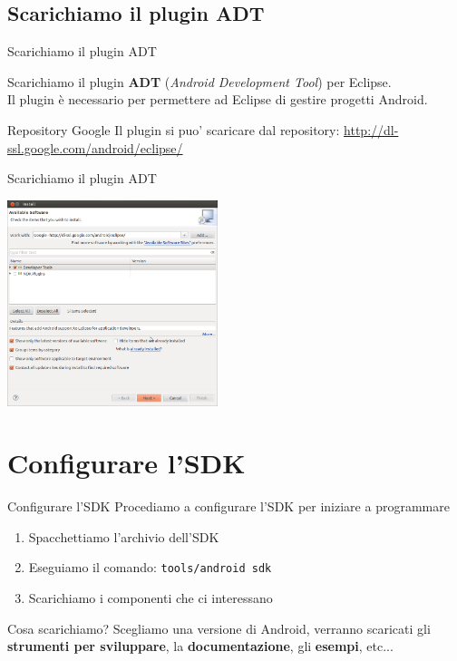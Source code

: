 \documentclass[xcolor=svgnames,11pt]{beamer}
\begin{document}
\subsection{Scarichiamo il plugin ADT}
\begin{frame}{Scarichiamo il plugin ADT}

Scarichiamo il plugin \textbf{ADT} (\emph{Android Development Tool}) per Eclipse.\\
\pause
\medskip
Il plugin \`e necessario per permettere ad Eclipse di gestire progetti Android.
\pause
\medskip
\begin{block}{Repository Google}
Il plugin si puo' scaricare dal repository: \url{http://dl-ssl.google.com/android/eclipse/}
\end{block}
\begin{center}
\end{center}
\end{frame}

\begin{frame}{Scarichiamo il plugin ADT}
\begin{center}
\includegraphics[height=6cm]{adt.png}
\end{center}
\end{frame}

\section{Configurare l'SDK}

\begin{frame}{Configurare l'SDK}
Procediamo a configurare l'SDK per iniziare a programmare
\pause
	\begin{enumerate}
		\item Spacchettiamo l'archivio dell'SDK
		\pause
		\item Eseguiamo il comando: \texttt{tools/android sdk}
		\pause
		\item Scarichiamo i componenti che ci interessano
	\end{enumerate}
\pause
\medskip
\begin{block}{Cosa scarichiamo?}
Scegliamo una versione di Android, verranno scaricati gli \textbf{strumenti per sviluppare}, la \textbf{documentazione}, gli \textbf{esempi}, etc...
\end{block}
\end{frame}
\end{document}
